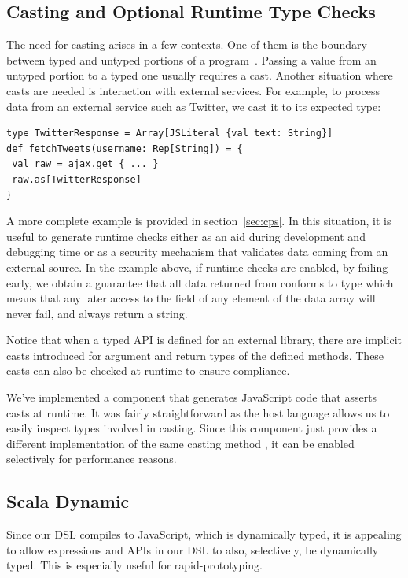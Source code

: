\documentclass[runningheads,a4paper]{llncs}
\begin{document}
\subsection{Casting and Optional Runtime Type Checks}
The need for casting arises in a few contexts. One of them is the
boundary between typed and untyped portions of a
program~\cite{wadler-blame,blame-for-all}. Passing a value from an
untyped portion to a typed one usually requires a cast. Another
situation where casts are needed is interaction with external
services. For example, to process data from an external service such
as Twitter, we cast it to its expected type:
\begin{lstlisting}
type TwitterResponse = Array[JSLiteral {val text: String}]
def fetchTweets(username: Rep[String]) = {
 val raw = ajax.get { ... }
 raw.as[TwitterResponse]
}
\end{lstlisting}
A more complete example is provided in section~\ref{sec:cps}. In this
situation, it is useful to generate runtime checks either as an aid
during development and debugging time or as a security mechanism that
validates data coming from an external source. In the example above,
if runtime checks are enabled, by failing early, we obtain a guarantee
that all data returned from  conforms to type
 which means that any later access to the
 field of any element of the data array will never fail, and
always return a string.

Notice that when a typed API is defined for an external library, there
are implicit casts introduced for argument and return types of the
defined methods. These casts can also be checked at runtime to
ensure compliance.

We've implemented a component that generates JavaScript code that
asserts casts at runtime. It was fairly straightforward as the host
language allows us to easily inspect types involved in casting. Since
this component just provides a different implementation of the same
casting method , it can be enabled selectively for
performance reasons.


\subsection{Scala Dynamic}
Since our DSL compiles to JavaScript, which is dynamically typed, it
is appealing to allow expressions and APIs in our DSL to also,
selectively, be dynamically typed. This is especially useful for
rapid-prototyping.
\end{document}
